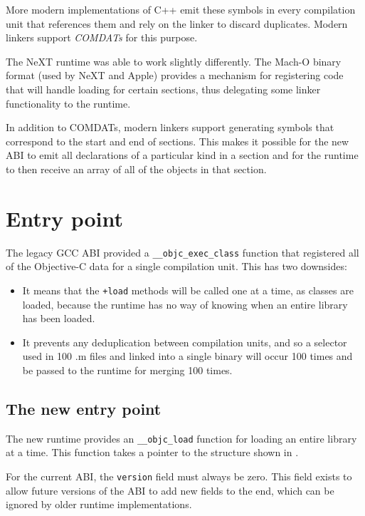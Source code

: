 \documentclass[a4paper]{report}
\newcommand{\file}[1]{\textsf{#1}}
\newcommand{\keyword}[1]{\textit{#1}}
\newcommand{\ccode}[1]{\lstinline[language={C}]{#1}}
\newcommand{\objc}[1]{\lstinline[language={[Objective]C}]{#1}}
\begin{document}
More modern implementations of C++ emit these symbols in every compilation unit that references them and rely on the linker to discard duplicates.
Modern linkers support \keyword{COMDATs} for this purpose.

The NeXT runtime was able to work slightly differently.
The Mach-O binary format (used by NeXT and Apple) provides a mechanism for registering code that will handle loading for certain sections, thus delegating some linker functionality to the runtime.

In addition to COMDATs, modern linkers support generating symbols that correspond to the start and end of sections.
This makes it possible for the new ABI to emit all declarations of a particular kind in a section and for the runtime to then receive an array of all of the objects in that section.

\chapter{Entry point}

The legacy GCC ABI provided a \ccode{__objc_exec_class} function that registered all of the Objective-C data for a single compilation unit.
This has two downsides:

\begin{itemize}
	\item It means that the \objc{+load} methods will be called one at a time, as classes are loaded, because the runtime has no way of knowing when an entire library has been loaded.
	\item It prevents any deduplication between compilation units, and so a selector used in 100 \file{.m} files and linked into a single binary will occur 100 times and be passed to the runtime for merging 100 times.
\end{itemize}

\section{The new entry point}

The new runtime provides an \ccode{__objc_load} function for loading an entire library at a time.
This function takes a pointer to the structure shown in .

For the current ABI, the \ccode{version} field must always be zero.
This field exists to allow future versions of the ABI to add new fields to the end, which can be ignored by older runtime implementations.
\end{document}

